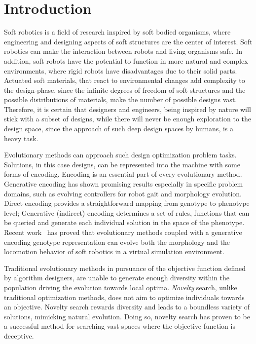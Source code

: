 
\chapter{Introduction} %
\label{Introduction} %


Soft robotics is a field of research inspired by soft bodied organisms, where  engineering and designing aspects of soft structures are the center of interest. Soft robotics can make the interaction between robots and living organisms safe. In addition, soft robots have the potential to function in more natural and  complex environments, where rigid robots have disadvantages due to their solid parts. Actuated soft materials, that react to environmental changes add complexity to the design-phase, since the infinite degrees of freedom of soft structures and the possible distributions of materials, make the number of possible designs vast. Therefore, it is certain that designers and engineers, being inspired by nature will stick with a subset of designs, while there will never be enough exploration to the design space, since the approach of such deep design spaces by humans, is a heavy task.

Evolutionary methods can approach such design optimization problem tasks. Solutions, in this case designs, can be represented into the machine with some forms of encoding. Encoding is an essential part of every evolutionary method. Generative encoding has shown promising results especially in specific problem domains, such as evolving controllers for robot gait and morphology evolution. Direct encoding provides a straightforward mapping from genotype to phenotype level; Generative (indirect) encoding determines a set of rules, functions that can be queried and generate each individual solution in the space of the phenotype. Recent work~\citep{cheney2013unshackling} has proved that evolutionary methods coupled with a generative encoding genotype representation can evolve both the morphology and the locomotion behavior of soft robotics in a virtual simulation environment.

Traditional evolutionary methods in pursuance of the objective function defined by algorithm designers, are unable to generate enough diversity within the population driving the evolution towards local optima. \emph{Novelty} search, unlike traditional optimization methods, does not aim to optimize individuals towards an objective. Novelty search rewards diversity and leads to a boundless variety of solutions, mimicking natural evolution. Doing so, novelty search has proven to be a successful method for searching vast spaces where the objective function is deceptive.

